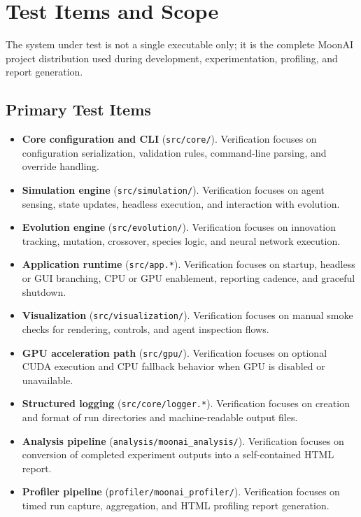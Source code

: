 \section{Test Items and Scope}
\label{sec:items}

The system under test is not a single executable only; it is the complete MoonAI project
distribution used during development, experimentation, profiling, and report generation.

\subsection{Primary Test Items}

\begin{itemize}[leftmargin=*]
	\item \textbf{Core configuration and CLI} (\texttt{src/core/}). Verification focuses on
	      configuration serialization, validation rules, command-line parsing, and override handling.

	\item \textbf{Simulation engine} (\texttt{src/simulation/}). Verification focuses on
	      agent sensing, state updates, headless execution, and interaction with evolution.

	\item \textbf{Evolution engine} (\texttt{src/evolution/}). Verification focuses on
	      innovation tracking, mutation, crossover, species logic, and neural network execution.

	\item \textbf{Application runtime} (\texttt{src/app.*}). Verification focuses on
	      startup, headless or GUI branching, CPU or GPU enablement, reporting cadence, and
	      graceful shutdown.

	\item \textbf{Visualization} (\texttt{src/visualization/}). Verification focuses on
	      manual smoke checks for rendering, controls, and agent inspection flows.

	\item \textbf{GPU acceleration path} (\texttt{src/gpu/}). Verification focuses on
	      optional CUDA execution and CPU fallback behavior when GPU is disabled or unavailable.

	\item \textbf{Structured logging} (\texttt{src/core/logger.*}). Verification focuses on
	      creation and format of run directories and machine-readable output files.

	\item \textbf{Analysis pipeline} (\texttt{analysis/moonai\_analysis/}). Verification
	      focuses on conversion of completed experiment outputs into a self-contained HTML report.

	\item \textbf{Profiler pipeline} (\texttt{profiler/moonai\_profiler/}). Verification
	      focuses on timed run capture, aggregation, and HTML profiling report generation.
\end{itemize}

